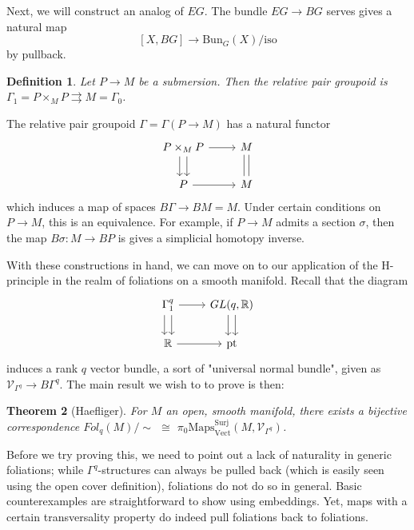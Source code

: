 \documentclass{article}
\newtheorem{theorem}{Theorem}[section]
\newtheorem{definition}[theorem]{Definition}
\newtheorem{proposed work}[theorem]{Proposed Work}
\theoremstyle{definition}
\begin{document}
Next, we will construct an analog of $EG$. The bundle $EG\to BG$ serves gives a natural map
\[[X,BG]\to \text{Bun}_G(X)/\text{iso}\]
by pullback.
\begin{definition}
  Let $P\to M$ be a submersion. Then the \emph{relative pair groupoid} is $\Gamma_1=P\times_MP\rightrightarrows M=\Gamma_0$. \end{definition}
The relative pair groupoid $\Gamma=\Gamma(P\to M)$ has a natural functor
\[  \begin{tikzcd}
    P\times_MP \ar[r]
    \ar[d,shift left=.75ex]
    \ar[d,shift right=.75ex] &
    M
    \ar[d,shift left=.5ex, dash]
    \ar[d,shift right=.5ex, dash] \\
    P\ar[r] &
    M
  \end{tikzcd}
\]
which induces a map of spaces $B\Gamma\to BM=M$. Under certain conditions on $P\to M$, this is an equivalence. For example, if $P\to M$ admits a section $\sigma$, then the map $B\sigma: M\to BP$ is gives a simplicial homotopy inverse.
\newline

With these constructions in hand, we can move on to our application of the H-principle in the realm of foliations on a smooth manifold. Recall that the diagram
\[  \begin{tikzcd}
    \Gamma^q_1 \ar[r]
    \ar[d,shift left=.75ex]
    \ar[d,shift right=.75ex] &
    GL(q,\R)
    \ar[d,shift left=.75ex]
    \ar[d,shift right=.75ex] \\
    \R \ar[r] &
    \text{pt}
  \end{tikzcd}
\]
induces a rank $q$ vector bundle, a sort of "universal normal bundle", given as $\mathcal{V}_{\Gamma^q} \rightarrow B\Gamma^q$. The main result we wish to to prove is then:

\begin{theorem}[Haefliger]
For $M$ an open, smooth manifold, there exists a bijective correspondence $\textit{Fol}_q(M)/\sim$ $\cong$ $\pi_0\mathrm{Maps}^{\mathrm{Surj}}_{\mathrm{Vect}}(M,\mathcal{V}_{\Gamma^q})$.
\end{theorem}

Before we try proving this, we need to point out a lack of naturality in generic foliations; while $\Gamma^q$-structures can always be pulled back (which is easily seen using the open cover definition), foliations do not do so in general. Basic counterexamples are straightforward to show using embeddings. Yet, maps with a certain transversality property do indeed pull foliations back to foliations.
\end{document}
